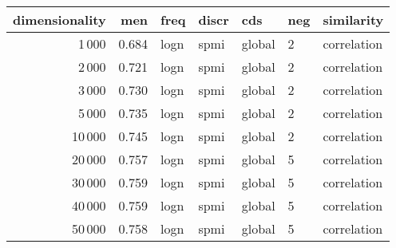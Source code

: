 \begin{tabular}{rrlllll}
\toprule
 dimensionality &    men &  freq & discr &     cds & neg &   similarity \\
\midrule
           1\,000 &  0.684 &  logn &  spmi &  global &   2 &  correlation \\
           2\,000 &  0.721 &  logn &  spmi &  global &   2 &  correlation \\
           3\,000 &  0.730 &  logn &  spmi &  global &   2 &  correlation \\
           5\,000 &  0.735 &  logn &  spmi &  global &   2 &  correlation \\
          10\,000 &  0.745 &  logn &  spmi &  global &   2 &  correlation \\
          20\,000 &  0.757 &  logn &  spmi &  global &   5 &  correlation \\
          30\,000 &  0.759 &  logn &  spmi &  global &   5 &  correlation \\
          40\,000 &  0.759 &  logn &  spmi &  global &   5 &  correlation \\
          50\,000 &  0.758 &  logn &  spmi &  global &   5 &  correlation \\
\bottomrule
\end{tabular}
